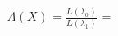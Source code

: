 \documentclass[preview]{standalone}
\begin{document}
\begin{align*}
\Lambda(X) = \frac{L(\lambda_0)}{L(\lambda_1)} =
\end{align*}
\end{document}
